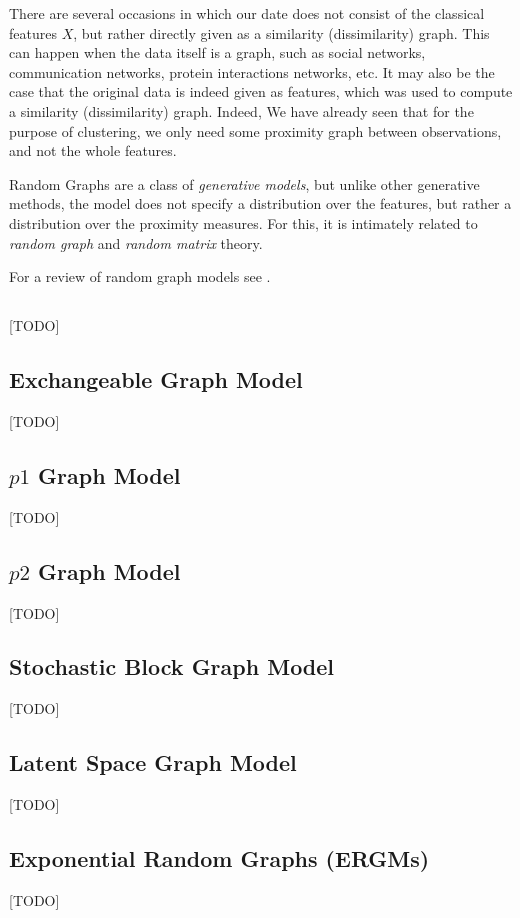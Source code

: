 There are several occasions in which our date does not consist of the classical features $X$, but rather directly given as a similarity (dissimilarity) graph. This can happen when the data itself is a graph, such as social networks, communication networks, protein interactions networks, etc. It may also be the case that the original data is indeed given as features, which was used to compute a similarity (dissimilarity) graph. Indeed, We have already seen that for the purpose of clustering, we only need some proximity graph between observations, and not the whole features. 

Random Graphs are a class of \emph{generative models}, but unlike other generative methods, the model does not specify a distribution over the features, but rather a distribution over the proximity measures.
For this, it is  intimately related to \emph{random graph} and \emph{random matrix} theory.

For a review of random graph models see \cite{goldenberg_survey_2010}.


\subsection{\erdos \renyi}
[TODO]

\subsection{Exchangeable Graph Model}
[TODO]

\subsection{$p1$ Graph Model}
[TODO]

\subsection{$p2$ Graph Model}
[TODO]

\subsection{Stochastic Block Graph Model}
[TODO]

\subsection{Latent Space Graph Model}
[TODO]

\subsection{Exponential Random Graphs (ERGMs)}
[TODO]

